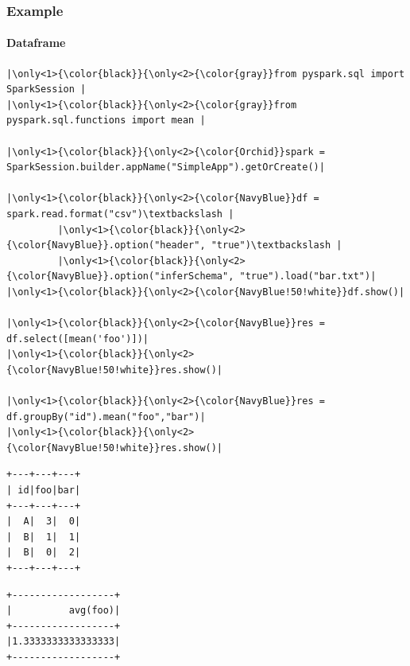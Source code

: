 \documentclass[aspectratio=169,dvipsnames]{beamer}
\begin{document}
\begin{frame}[fragile]
        \frametitle{Example}
        \framesubtitle{Dataframe}
        \vspace*{-5ex}
        \begin{center}
        \begin{minipage}{0.8\textwidth}
\begin{lstlisting}[escapechar={|}, title=dataframe.py]
|\only<1>{\color{black}}{\only<2>{\color{gray}}from pyspark.sql import SparkSession |
|\only<1>{\color{black}}{\only<2>{\color{gray}}from pyspark.sql.functions import mean |

|\only<1>{\color{black}}{\only<2>{\color{Orchid}}spark = SparkSession.builder.appName("SimpleApp").getOrCreate()|

|\only<1>{\color{black}}{\only<2>{\color{NavyBlue}}df = spark.read.format("csv")\textbackslash |
         |\only<1>{\color{black}}{\only<2>{\color{NavyBlue}}.option("header", "true")\textbackslash |
         |\only<1>{\color{black}}{\only<2>{\color{NavyBlue}}.option("inferSchema", "true").load("bar.txt")|
|\only<1>{\color{black}}{\only<2>{\color{NavyBlue!50!white}}df.show()|

|\only<1>{\color{black}}{\only<2>{\color{NavyBlue}}res = df.select([mean('foo')])|
|\only<1>{\color{black}}{\only<2>{\color{NavyBlue!50!white}}res.show()|

|\only<1>{\color{black}}{\only<2>{\color{NavyBlue}}res = df.groupBy("id").mean("foo","bar")|
|\only<1>{\color{black}}{\only<2>{\color{NavyBlue!50!white}}res.show()|

\end{lstlisting}
\end{minipage}
\end{center}
        
\end{frame}
\newsavebox{\mydfshowlisting}
\newsavebox{\myresoneshowlisting}
\newsavebox{\myrestwoshowlisting}
\begin{lrbox}{\mydfshowlisting}
\begin{lstlisting}[basicstyle=\ttfamily\tiny, frame=none]
+---+---+---+
| id|foo|bar|
+---+---+---+
|  A|  3|  0|
|  B|  1|  1|
|  B|  0|  2|
+---+---+---+
\end{lstlisting}
\end{lrbox}

\begin{lrbox}{\myresoneshowlisting}
\begin{lstlisting}[basicstyle=\ttfamily\tiny, frame=none]
+------------------+
|          avg(foo)|
+------------------+
|1.3333333333333333|
+------------------+
\end{lstlisting}
\end{lrbox}
\end{document}
